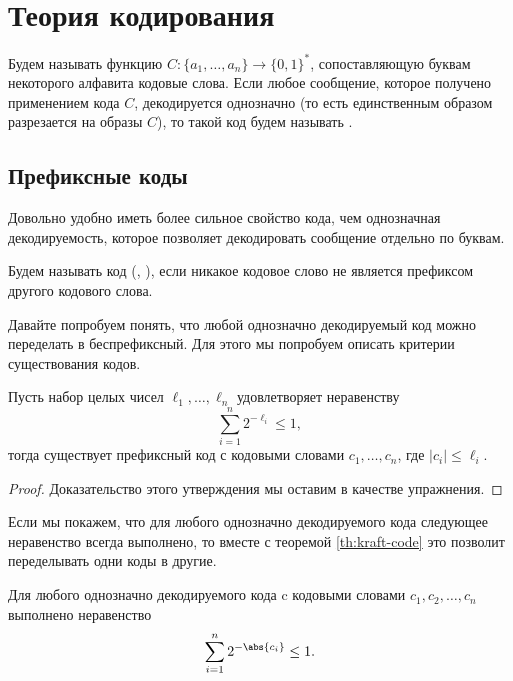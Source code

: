 \section{Теория кодирования}

\begin{definition}
    Будем называть  функцию $C\colon \{a_1, \dots , a_n\} \to \{0, 1\}^{*}$,
    сопоставляющую буквам некоторого алфавита кодовые слова. Если любое сообщение, которое получено
    применением кода $C$, декодируется однозначно (то есть единственным образом разрезается на образы
    $C$), то такой код будем называть .
\end{definition}

\subsection{Префиксные коды}

Довольно удобно иметь более сильное свойство кода, чем однозначная декодируемость, которое позволяет
декодировать сообщение отдельно по буквам.

\begin{definition}
    Будем называть код  (, ), если
    никакое кодовое слово не является префиксом другого кодового слова.
\end{definition}

Давайте попробуем понять, что любой однозначно декодируемый код можно переделать в беспрефиксный. Для
этого мы попробуем описать критерии существования кодов.

\begin{theorem}
    \label{th:kraft-code}
    Пусть набор целых чисел $\ell_1, \dots, \ell_n$ удовлетворяет неравенству
    $$
        \sum\limits_{i = 1}^{n} 2^{-\ell_i} \le 1,
    $$
    тогда существует префиксный код с кодовыми словами $c_1, \dots , c_n$, где $|c_i| \le \ell_i$.
\end{theorem}

\begin{proof}
    Доказательство этого утверждения мы оставим в качестве упражнения.
\end{proof} 

Если мы покажем, что для любого однозначно декодируемого кода следующее неравенство всегда выполнено, то
вместе с теоремой \ref{th:kraft-code} это позволит переделывать одни коды в другие.

\begin{proposition}
    Для любого однозначно декодируемого кода c кодовыми словами $c_1, c_2, \dots, c_n$ выполнено
    неравенство
    $$
        \sum_{i = 1}^n 2^{-\abs{c_i}}\le 1.
    $$ 
\end{proposition}

